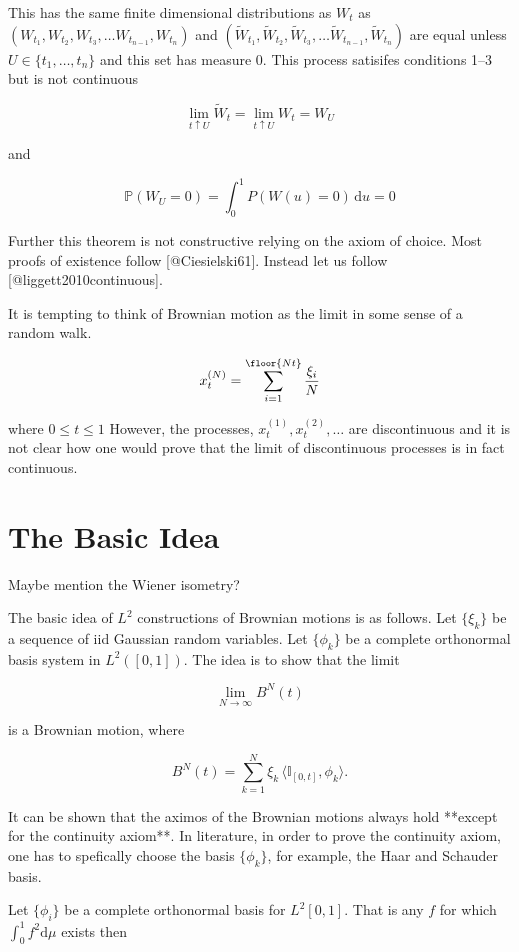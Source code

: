 \documentclass{article}
\begin{document}
This has the same finite dimensional distributions as $W_t$ as
$(W_{t_1}, W_{t_2}, W_{t_3}, \ldots W_{t_{n-1}}, W_{t_n})$ and
$(\tilde{W}_{t_1}, \tilde{W}_{t_2}, \tilde{W}_{t_3}, \ldots
\tilde{W}_{t_{n-1}}, \tilde{W}_{t_n})$ are equal unless $U \in \{t_1,
\ldots, t_n\}$ and this set has measure 0. This process satisifes
conditions 1--3 but is not continuous

$$
\lim_{t \uparrow U} \tilde{W}_t = \lim_{t \uparrow U} W_t = W_U
$$

and

$$
\mathbb{P}(W_U = 0) = \int_0^1 P(W(u)=0)\,\mathrm du=0
$$

Further this theorem is not constructive relying on the axiom of
choice. Most proofs of existence follow [@Ciesielski61]. Instead let
us follow [@liggett2010continuous].

It is tempting to think of Brownian motion as the limit in some sense
of a random walk.

$$
x_t^{(N)} = \sum_{i=1}^\floor{Nt}\frac{\xi_i}{N}
$$

where $0 \le t \le 1$ However, the processes, $x_t^{(1)}, x_t^{(2)},
\ldots$ are discontinuous and it is not clear how one would prove that
the limit of discontinuous processes is in fact continuous.

\section{The Basic Idea}

Maybe mention the Wiener isometry?

The basic idea of $L^2$ constructions of Brownian motions is as
follows. Let $\{\xi_k\}$ be a sequence of iid Gaussian random
variables. Let $\{\phi_k\}$ be a complete orthonormal basis system in
$L^2([0,1])$. The idea is to show that the limit

$$
\lim_{N\to \infty} B^N(t)
$$

is a Brownian motion, where

$$
B^N(t) = \sum^N_{k=1} \xi_k \, \langle \mathbb{I}_{[0,t]}, \phi_k \rangle.
$$

It can be shown that the aximos of the Brownian motions always hold
**except for the continuity axiom**. In literature, in order to prove
the continuity axiom, one has to spefically choose the basis
$\{\phi_k\}$, for example, the Haar and Schauder basis.


Let $\{\phi_i\}$ be a complete orthonormal basis for $L^2[0,1]$. That
is any $f$ for which $\int_0^1 f^2 \mathrm{d}\mu$ exists then
\end{document}
